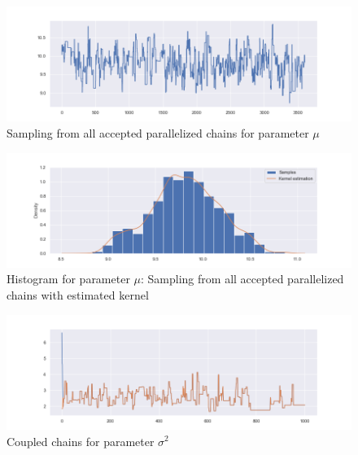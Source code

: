 \documentclass[11pt,a4paper,oneside]{report}
\begin{document}
\begin{figure}[h!]
	\centering
	\includegraphics[width=\textwidth]{doublecoupling_pack/doublecoupling_sampling_mu}
	\caption{Sampling from all accepted parallelized chains for parameter $\mu$ }   %
	\label{muallsamdouble}
\end{figure}


\begin{figure}[h!]
	\centering
	\includegraphics[width=\textwidth]{doublecoupling_pack/doublecoupling_mu_histogram_kernel}
	\caption{Histogram for parameter $\mu$: Sampling from all accepted parallelized chains with estimated kernel }   %
	\label{muhistdouble}
\end{figure}






\begin{figure}[h!]
	\centering
	\includegraphics[width=\textwidth]{doublecoupling_pack/doublecoupling_sigma_chain_meeting}
	\caption{Coupled chains for parameter $\sigma^2$ }   %
	\label{sigmacoupledchains}
\end{figure}
\end{document}
